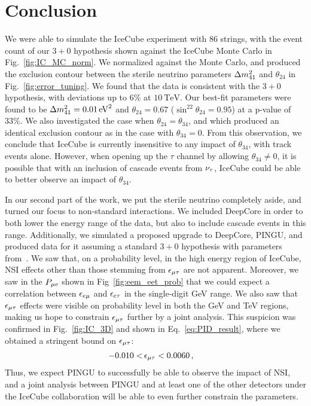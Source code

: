 \chapter{Conclusion}\label{ch:conc}
We were able to simulate the IceCube experiment with 86 strings, with the event count of our $3+0$ hypothesis shown against the IceCube Monte Carlo in Fig.~\ref{fig:IC_MC_norm}. 
We normalized against the Monte Carlo, and produced the exclusion contour between the sterile neutrino parameters $\dm[41]$ and $\theta_{24}$ in Fig.~\ref{fig:error_tuning}.
We found that the data is consistent with the $3+0$ hypothesis, with deviations up to 6\% at $\SI{10}{\TeV}$.
Our best-fit parameters were found to be $\dm[41] = \SI{0.01}{\eV^2}$ and $\theta_{24} = 0.67$ ($\sin^22\theta_{24} = 0.95$) at 
a p-value of $33\%$.
We also investigated the case when $\theta_{24} = \theta_{34}$, and which produced an identical exclusion contour as in the case with $\theta_{34}=0$. From this observation, 
we conclude that IceCube is currently insensitive to any impact of $\theta_{34}$, with track events alone. However,
when opening up the $\tau$ channel by allowing $\theta_{34} \neq 0$, it is possible that with an inclusion of cascade events from $\nu_\tau$, IceCube could be able to better observe 
an impact of $\theta_{34}$.

In our second part of the work, we put the sterile neutrino completely aside, and turned our focus to non-standard interactions. 
We included DeepCore in order to both lower the energy range of the data, but also to include cascade events in this range. 
Additionally, we simulated a proposed upgrade to DeepCore, PINGU, and produced data for it assuming a standard $3+0$ hypothesis with parameters from~\cite{nufit}.
We saw that, on a probability level, in the high energy region of IceCube, NSI effects other than those stemming from $\epsilon_{\mu\tau}$ are not apparent.
Moreover, we saw in the $P_{\mu e}$ shown in Fig~\ref{fig:eem_eet_prob} that we could expect a correlation between $\epsilon_{e\mu}$ and $\epsilon_{e\tau}$ in the single-digit \si{\GeV} range.
We also saw that $\epsilon_{\mu\tau}$ effects were visible on probability level in both the \si{\GeV} and \si{\TeV} regions, making us hope to constrain $\epsilon_{\mu\tau}$ further by 
a joint analysis. This suspicion was confirmed in Fig.~\ref{fig:IC_3D} and shown in Eq.~\ref{eq:PID_result}, where we obtained a stringent bound on $\epsilon_{\mu\tau}$:
\begin{align}
    -0.010 <&\, \epsilon_{\mu\tau} < 0.0060\,,
 \end{align}
Thus, we expect PINGU to successfully be able to observe the impact of NSI, and a joint analysis between PINGU and at least one of the other detectors under the IceCube collaboration
will be able to even further constrain the parameters.

